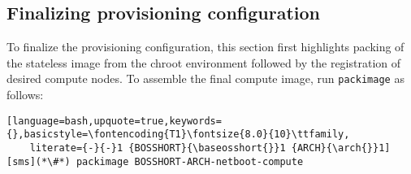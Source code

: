 \subsection{Finalizing provisioning configuration} \label{sec:assemble_bootstrap}

To finalize the \xCAT{} provisioning configuration, this section first highlights
packing of the stateless image from the chroot environment followed by the
registration of desired compute nodes. To assemble the final compute image, run
\texttt{packimage} as follows:

\begin{lstlisting}[language=bash,upquote=true,keywords={},basicstyle=\fontencoding{T1}\fontsize{8.0}{10}\ttfamily,
    literate={-}{-}1 {BOSSHORT}{\baseosshort{}}1 {ARCH}{\arch{}}1]
[sms](*\#*) packimage BOSSHORT-ARCH-netboot-compute
\end{lstlisting}

